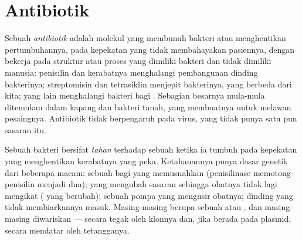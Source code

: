 \section{Antibiotik}

\begin{definition}[Antibiotik]\label{def:g11:antibiotic-resistance:antibiotic}
Sebuah \emph{antibiotik} adalah molekul yang membunuh
bakteri atau menghentikan pertumbuhannya, pada kepekatan yang tidak
membahayakan  pasiennya, dengan bekerja pada struktur atau proses
yang dimiliki bakteri dan tidak dimiliki  manusia: penisilin dan
kerabatnya menghalangi pembangunan dinding bakterinya; streptomisin dan
tetrasiklin menjepit  bakterinya, yang berbeda dari 
kita; yang lain menghalangi  bakteri bagi . Sebagian
besarnya mula-mula ditemukan dalam kapang dan bakteri tanah, yang
membuatnya untuk melawan pesaingnya. Antibiotik tidak berpengaruh pada
virus, yang tidak punya satu pun sasaran itu.
\end{definition}

\begin{proposition}\label{prop:g11:antibiotic-resistance:mechanisms}
Sebuah bakteri bersifat \emph{tahan}
terhadap sebuah  ketika ia tumbuh pada kepekatan yang
menghentikan kerabatnya yang peka. Ketahanannya punya dasar genetik
dari beberapa macam: sebuah  bagi  yang memusnahkan
 (penisilinase memotong penisilin menjadi dua); 
yang mengubah sasaran  sehingga obatnya tidak lagi
mengikat (  yang berubah); sebuah pompa yang mengusir
obatnya; dinding yang tidak membiarkannya masuk. Masing-masing berupa
sebuah  atau , dan masing-masing diwariskan --- secara tegak
oleh klonnya dan, jika berada pada plasmid, secara mendatar oleh
tetangganya.
\end{proposition}
\admitted

